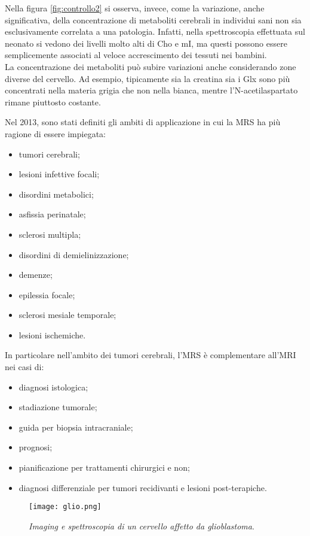 \documentclass{report}
\newcommand{\figref}[1]{figura \ref{#1}}
\numberwithin{equation}{section}
\numberwithin{figure}{section}
\begin{document}
Nella \figref{fig:controllo2} si osserva, invece, come la variazione, anche significativa, della concentrazione di metaboliti cerebrali in individui sani non sia esclusivamente correlata a una patologia. Infatti, nella spettroscopia effettuata sul neonato si vedono dei livelli molto alti di Cho e mI, ma questi possono essere semplicemente associati al veloce accrescimento dei tessuti nei bambini.\\
La concentrazione dei metaboliti può subire variazioni anche considerando zone diverse del cervello. Ad esempio, tipicamente sia la creatina sia i Glx sono più concentrati nella materia grigia che non nella bianca, mentre l'N-acetilaspartato rimane piuttosto costante.

Nel 2013, sono stati definiti gli ambiti di applicazione in cui la MRS ha più ragione di essere impiegata:
\begin{itemize}[label=$-$]
    \item tumori cerebrali;
    \item lesioni infettive focali;
    \item disordini metabolici;
    \item asfissia perinatale;
    \item sclerosi multipla;
    \item disordini di demielinizzazione;
    \item demenze;
    \item epilessia focale;
    \item sclerosi mesiale temporale;
    \item lesioni ischemiche.
\end{itemize}
In particolare nell'ambito dei tumori cerebrali, l'MRS è complementare all'MRI nei casi di:
\begin{itemize}[label=$-$]
    \item diagnosi istologica;
    \item stadiazione tumorale;
    \item guida per biopsia intracraniale;
    \item prognosi;
    \item pianificazione per trattamenti chirurgici e non;
    \item diagnosi differenziale per tumori recidivanti e lesioni post-terapiche.
\end{itemize}

\begin{figure}[htp]
\centering
\texttt{[image: glio.png]}
\caption{\label{fig:glio} \textit{Imaging e spettroscopia di un cervello affetto da glioblastoma}.}
\end{figure}
\end{document}
